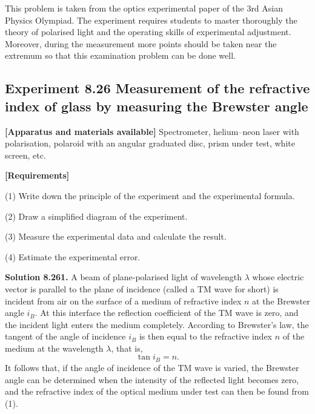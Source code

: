 \begin{commentary}
This problem is taken from the optics experimental paper of the 3rd Asian Physics Olympiad. The experiment requires students to master thoroughly the theory of polarised light and the operating skills of experimental adjustment. Moreover, during the measurement more points should be taken near the extremum so that this examination problem can be done well.
\end{commentary}

\subsection*{Experiment 8.26 \quad Measurement of the refractive index of glass by measuring the Brewster angle}

\textbf{[Apparatus and materials available]} Spectrometer, helium--neon laser with polarisation, polaroid with an angular graduated disc, prism under test, white screen, etc.

\textbf{[Requirements]}

(1) Write down the principle of the experiment and the experimental formula.

(2) Draw a simplified diagram of the experiment.

(3) Measure the experimental data and calculate the result.

(4) Estimate the experimental error.

\textbf{Solution 8.26}\quad \textbf{1.} A beam of plane-polarised light of wavelength $\lambda$ whose electric vector is parallel to the plane of incidence (called a TM wave for short) is incident from air on the surface of a medium of refractive index $n$ at the Brewster angle $i_B$. At this interface the reflection coefficient of the TM wave is zero, and the incident light enters the medium completely. According to Brewster's law, the tangent of the angle of incidence $i_B$ is then equal to the refractive index $n$ of the medium at the wavelength $\lambda$, that is,
\begin{equation}
\tan i_B=n. \tag{1}
\end{equation}
It follows that, if the angle of incidence of the TM wave is varied, the Brewster angle can be determined when the intensity of the reflected light becomes zero, and the refractive index of the optical medium under test can then be found from (1).

